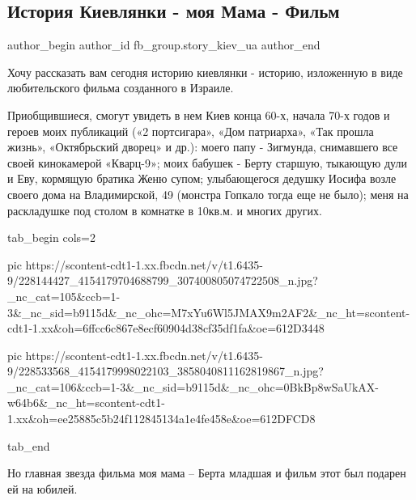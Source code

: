  
 
 
 
 
 
\subsection{История Киевлянки - моя Мама - Фильм}
\label{sec:31_07_2021.fb.fb_group.story_kiev_ua.1.mama_film_kievljanka}
 
\ifcmt
 author_begin
   author_id fb_group.story_kiev_ua
 author_end
\fi

Хочу рассказать вам сегодня историю киевлянки - историю, изложенную в виде
любительского фильма созданного в Израиле. 

Приобщившиеся, смогут увидеть в нем Киев конца 60-х, начала 70-х годов и героев
моих публикаций («2 портсигара», «Дом патриарха», «Так прошла жизнь»,
«Октябрьский дворец» и др.): моего папу - Зигмунда, снимавшего все своей
кинокамерой «Кварц-9»; моих бабушек - Берту старшую, тыкающую дули и Еву,
кормящую братика Женю супом; улыбающегося дедушку Иосифа возле своего дома на
Владимирской, 49 (монстра Гопкало тогда еще не было); меня на раскладушке под
столом в комнатке в 10кв.м. и многих других.

\ifcmt
  tab_begin cols=2

     pic https://scontent-cdt1-1.xx.fbcdn.net/v/t1.6435-9/228144427_4154179704688799_307400805074722508_n.jpg?_nc_cat=105&ccb=1-3&_nc_sid=b9115d&_nc_ohc=M7xYu6Wl5JMAX9m2AF2&_nc_ht=scontent-cdt1-1.xx&oh=6ffcc6c867e8ecf60904d38cf35df1fa&oe=612D3448

     pic https://scontent-cdt1-1.xx.fbcdn.net/v/t1.6435-9/228533568_4154179998022103_3858040811162819867_n.jpg?_nc_cat=106&ccb=1-3&_nc_sid=b9115d&_nc_ohc=0BkBp8wSaUkAX-w64b6&_nc_ht=scontent-cdt1-1.xx&oh=ee25885c5b24f112845134a1e4fe458e&oe=612DFCD8
     
  tab_end
\fi

Но главная звезда фильма моя мама – Берта младшая и фильм этот был подарен ей
на юбилей.


